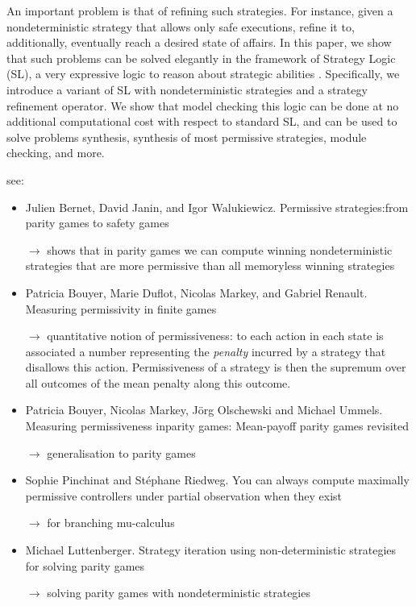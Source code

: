 An important problem is that of refining
  such strategies. For instance, given a nondeterministic strategy
  that allows only safe executions, refine it to, additionally,
  eventually reach a desired state of affairs.  In this paper, we show that such
  problems can be solved elegantly in the framework of Strategy Logic
  (SL), a very expressive logic to reason about strategic
  abilities \cite{chatterjee2010strategy,DBLP:journals/tocl/MogaveroMPV14,DBLP:conf/lics/MogaveroMS13,BMMRV17}. Specifically, we introduce a variant of SL with
  nondeterministic strategies and a strategy refinement operator. We
  show that model checking this logic can be done at no additional
  computational cost with respect to standard SL, and can be used to
  solve problems synthesis, synthesis of most permissive strategies,
  module checking, and more.


see:
\begin{itemize}
\item Julien Bernet, David Janin, and Igor Walukiewicz. Permissive
  strategies:from parity games to safety games

  $\rightarrow$ shows that in parity games we can compute winning nondeterministic
  strategies that are more permissive than all memoryless winning strategies
\item Patricia Bouyer, Marie Duflot, Nicolas Markey, and Gabriel
  Renault. Measuring permissivity in finite games

  $\rightarrow$ quantitative notion of permissiveness: to each action in
  each state is associated a number representing the \emph{penalty}
  incurred by a strategy that disallows this action. Permissiveness of
  a strategy is then the supremum over all outcomes of the mean
  penalty along this outcome.
  
\item Patricia Bouyer, Nicolas Markey, Jörg Olschewski and Michael
  Ummels. Measuring permissiveness inparity games: Mean-payoff parity
  games revisited

  $\rightarrow$ generalisation to parity games
  
\item Sophie Pinchinat and Stéphane Riedweg. You can always compute
  maximally permissive controllers under partial observation when they
  exist
  
$\rightarrow$   for branching mu-calculus

  
\item Michael Luttenberger. Strategy iteration using non-deterministic
  strategies for solving parity games  

$\rightarrow$ solving parity games with nondeterministic strategies

\end{itemize}

